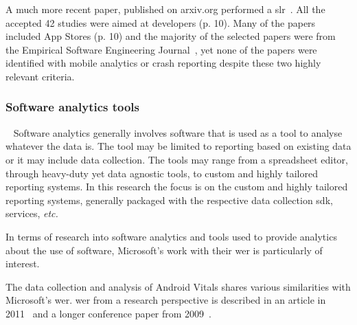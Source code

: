 A much more recent paper, published on arxiv.org performed a \Gls{slr}~. All the accepted 42 studies were aimed at developers (p. 10). Many of the papers included App Stores (p. 10) and the majority of the selected papers were from the Empirical Software Engineering Journal~, yet none of the papers were identified with mobile analytics or crash reporting despite these two highly relevant criteria. 


\subsubsection{Software analytics tools}~\label{rw-software-analytics-tools-research}
Software analytics generally involves software that is used as a tool to analyse whatever the data is. The tool may be limited to reporting based on existing data or it may include data collection. The tools may range from a spreadsheet editor, through heavy-duty yet data agnostic tools, to custom and highly tailored reporting systems. In this research the focus is on the custom and highly tailored reporting systems, generally packaged with the respective data collection \Gls{sdk}, services, \emph{etc.}  

In terms of research into software analytics and tools used to provide analytics about the use of software, Microsoft's work with their \Gls{wer} is particularly of interest. 

The data collection and analysis of Android Vitals shares various similarities with Microsoft's \acrfull{wer}. \Gls{wer} from a research perspective is described in an article in 2011~ and a longer conference paper from 2009~. 

